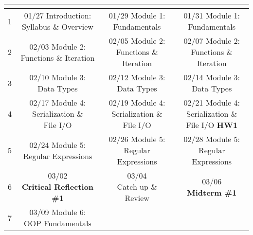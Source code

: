 \documentclass[11pt]{article}
\begin{document}
\begin{tabular}{| r | c | c | c |}
	\hline
	\cellcolor{gray!40} \colorbox{gray!40}{\makecell{Week}} &
	\cellcolor{gray!40} \colorbox{gray!40}{\makecell{Monday}} &
	\cellcolor{gray!40} \colorbox{gray!40}{\makecell{Wednesday}} &
	\cellcolor{gray!40} \colorbox{gray!40}{\makecell{Friday}} \\
	\hline 1 & 
	\makecell{01/27 Introduction: \\Syllabus \& Overview} & 
	\makecell{01/29 Module 1: \\Fundamentals} & 
	\makecell{01/31 Module 1: \\Fundamentals} \\
	\hline 2 & 
	\makecell{02/03 Module 2: \\Functions \& Iteration} & 
	\makecell{02/05 Module 2: \\Functions \& Iteration} & 
	\makecell{02/07 Module 2: \\Functions \& Iteration} \\
	\hline 3 & 
	\makecell{02/10 Module 3: \\Data Types} & 
	\makecell{02/12 Module 3: \\Data Types} & 
	\makecell{02/14 Module 3: \\Data Types} \\
	\hline 4 & 
	\makecell{02/17 Module 4: \\Serialization \& \\File I/O} & 
	\makecell{02/19 Module 4: \\Serialization \& \\File I/O} &
	\makecell{02/21 Module 4: \\Serialization \& \\File I/O \textbf{HW1}} \\
	\hline 5 &
	\makecell{02/24 Module 5: \\Regular Expressions} &
	\makecell{02/26 Module 5: \\Regular Expressions} &
	\makecell{02/28 Module 5: \\Regular Expressions} \\
	\hline 6 &
	\makecell{03/02 \\ \textbf{Critical Reflection \#1}} &
	\makecell{03/04 \\ Catch up \& Review} &
	\makecell{03/06 \\ \textbf{Midterm \#1}} \\
	\hline 7 &	
	\makecell{03/09 Module 6: \\OOP Fundamentals} &

\end{tabular}
\end{document}
